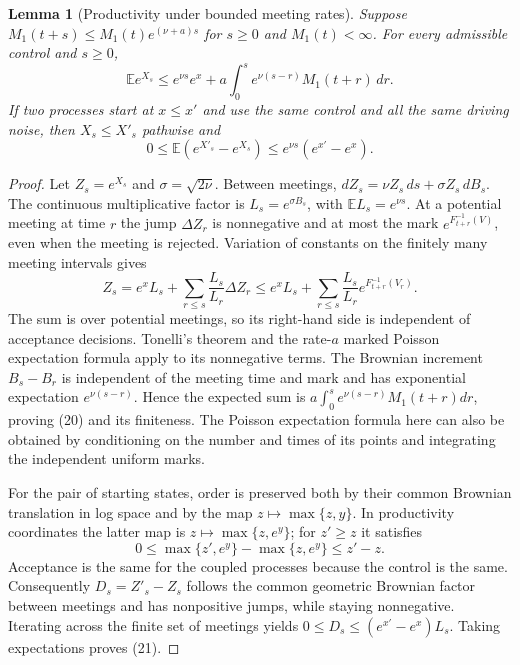 \documentclass[11pt]{article}
\newtheorem{lemma}[theorem]{Lemma}
\newcommand{\E}{\mathbb E}
\begin{document}
\begin{lemma}[Productivity under bounded meeting rates]\label{productivity}
Suppose $M_1(t+s)\leq M_1(t)e^{(\nu+a)s}$ for $s\geq0$ and $M_1(t)<\infty$.
For every admissible control and $s\geq0$,
\[
 \E e^{X_s}\leq e^{\nu s}e^x
       +a\int_0^s e^{\nu(s-r)}M_1(t+r)\,dr.                 \tag{20}
\]
If two processes start at $x\leq x'$ and use the same control and all the
same driving noise, then $X_s\leq X'_s$ pathwise and
\[
 0\leq\E(e^{X'_s}-e^{X_s})\leq e^{\nu s}(e^{x'}-e^x).       \tag{21}
\]
\end{lemma}
\begin{proof}
Let $Z_s=e^{X_s}$ and $\sigma=\sqrt{2\nu}$. Between meetings,
$dZ_s=\nu Z_s\,ds+\sigma Z_s\,dB_s$.
The continuous multiplicative factor is $L_s=e^{\sigma B_s}$, with
$\E L_s=e^{\nu s}$. At a potential meeting at time $r$ the jump
$\Delta Z_r$ is nonnegative and at most the mark
$e^{F_{t+r}^{-1}(V)}$, even when the meeting is rejected.
Variation of constants on the finitely many meeting intervals gives
\[
 Z_s=e^xL_s+\sum_{r\leq s}\frac{L_s}{L_r}\Delta Z_r
 \leq e^xL_s+
       \sum_{r\leq s}\frac{L_s}{L_r}e^{F_{t+r}^{-1}(V_r)}.
\]
The sum is over potential meetings, so its right-hand side is independent
of acceptance decisions. Tonelli's theorem and the rate-$a$ marked
Poisson expectation formula apply to its nonnegative terms.
The Brownian increment $B_s-B_r$ is independent of the meeting time and
mark and has exponential expectation $e^{\nu(s-r)}$. Hence the expected
sum is $a\int_0^s e^{\nu(s-r)}M_1(t+r)dr$, proving (20) and its
finiteness. The Poisson expectation formula here can also be obtained by
conditioning on the number and times of its points and integrating the
independent uniform marks.

For the pair of starting states, order is preserved both by their common
Brownian translation in log space and by the map $z\mapsto\max\{z,y\}$.
In productivity coordinates the latter map is
$z\mapsto\max\{z,e^y\}$; for $z'\geq z$ it satisfies
\[
 0\leq\max\{z',e^y\}-\max\{z,e^y\}\leq z'-z.
\]
Acceptance is the same for the coupled processes because the control is
the same. Consequently $D_s=Z'_s-Z_s$ follows the common geometric
Brownian factor between meetings and has nonpositive jumps, while staying
nonnegative. Iterating across the finite set of meetings yields
$0\leq D_s\leq(e^{x'}-e^x)L_s$. Taking expectations proves (21).
\end{proof}
\end{document}
